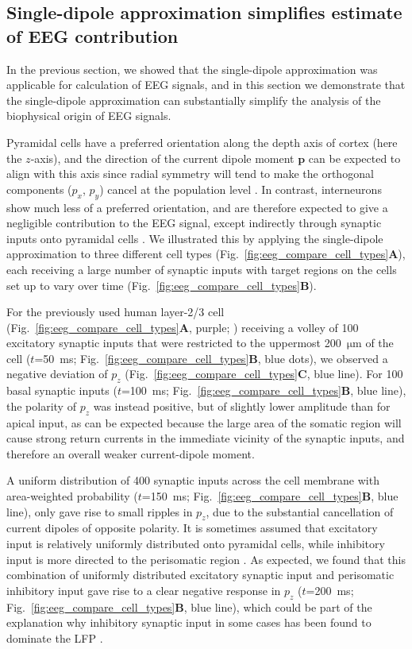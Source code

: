 \documentclass[preprint,10pt,authoryear]{elsarticle}
\newcommand{\newtxt}[1]{{\color{Red}#1}}
\begin{document}
\subsection{Single-dipole approximation simplifies estimate of EEG contribution}\label{subsec:compare_neurons}
In the previous section, we showed that the single-dipole approximation was applicable for calculation of EEG signals, and in this section we demonstrate that the single-dipole approximation can substantially simplify the analysis of the biophysical origin of EEG signals.

Pyramidal cells have a preferred orientation along the depth axis of cortex (here the $z$-axis), and the direction of the current dipole moment $\mathbf{p}$ can be expected to align with this axis since
radial symmetry will tend to make the orthogonal components ($p_x$, $p_y$) cancel at the population level \citep{HAGEN2018}. 
In contrast, interneurons show much less of a preferred orientation, and are therefore expected to give a negligible contribution to the EEG signal, except indirectly through synaptic inputs onto pyramidal cells \citep{HAGEN2016}.
We illustrated this by applying the single-dipole approximation to three different cell types (Fig.~\ref{fig:eeg_compare_cell_types}\textbf{A}), each receiving a large number of synaptic inputs with target regions on the cells set up to vary over time (Fig.~\ref{fig:eeg_compare_cell_types}\textbf{B}).

For the previously used human layer-2/3 cell (Fig.~\ref{fig:eeg_compare_cell_types}\textbf{A}, purple; \cite{EYAL2016})
receiving a volley of \newtxt{100} excitatory synaptic inputs that were restricted to the uppermost 200~$\si{\um}$ of the cell ($t$=50~ms; Fig.~\ref{fig:eeg_compare_cell_types}\textbf{B}, \newtxt{blue} dots), we observed a negative deviation of $p_z$ (Fig.~\ref{fig:eeg_compare_cell_types}\textbf{C}, \newtxt{blue} line). For \newtxt{100} basal synaptic input\newtxt{s} ($t$=100~ms; Fig.~\ref{fig:eeg_compare_cell_types}\textbf{B}, \newtxt{blue} line), the polarity of $p_z$ was instead positive, but of slightly lower amplitude than for apical input, as can be expected because the large area of the somatic region will cause strong return currents in the immediate vicinity of the synaptic inputs, and therefore an overall weaker current-dipole moment.

A uniform distribution of 400 synaptic inputs across the cell membrane with area-weighted probability ($t$=150~ms; Fig.~\ref{fig:eeg_compare_cell_types}\textbf{B}, \newtxt{blue} line), only gave rise to small ripples in $p_z$, due to the substantial cancellation of current dipoles of opposite polarity. It is sometimes assumed that excitatory input is relatively uniformly distributed onto pyramidal cells, while inhibitory input is more directed to the perisomatic region \citep{Mazzoni2015, Telenczuk2019, Skaar2020, Telenczuk2020}. As expected, we found that this combination of uniformly distributed excitatory synaptic input and perisomatic inhibitory input gave rise to a clear negative response in $p_z$ ($t$=200~ms; Fig.~\ref{fig:eeg_compare_cell_types}\textbf{B}, \newtxt{blue} line), which could be part of the explanation why inhibitory synaptic input in some cases has been found to dominate the LFP \citep{HAGEN2016, TELENCZUK2016}.
\end{document}
